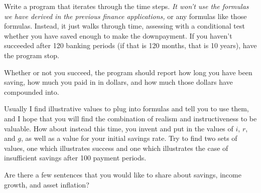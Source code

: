 \bigskip

\nobreak\bigskip

\noindent Write a program that iterates through the time steps. {\it It won't use the formulas we have derived in the previous finance applications,} or any formulas like those formulas. Instead, it just walks through time, assessing with a conditional test whether you have saved enough to make the downpayment. If you haven't succeeded after 120 banking periods (if that is 120 months, that is 10 years), have the program stop.

Whether or not you succeed, the program should report how long you have been saving, how much you paid in in dollars, and how much those dollars have compounded into.

\bigskip


\nobreak\bigskip

\noindent Usually I find illustrative values to plug into formulas and tell you to use them, and I hope that you will find the combination of realism and instructiveness to be valuable. How about instead this time, you invent and put in the values of $i$, $r$, and $g$, as well as a value for your initial savings rate. Try to find two sets of values, one which illustrates success and one which illustrates the case of insufficient savings after 100 payment periods.

\bigskip

\nobreak\bigskip

\noindent Are there a few sentences that you would like to share about savings, income growth, and asset inflation?
\bigskip

\bye
